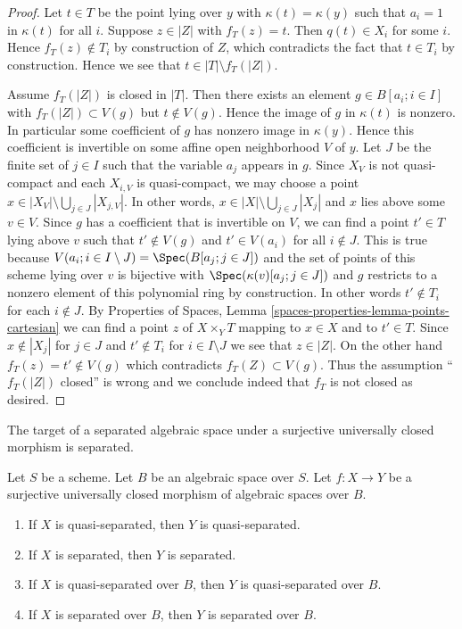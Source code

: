 \begin{proof}
\medskip\noindent
Let $t \in T$ be the point lying over $y$ with $\kappa(t) = \kappa(y)$
such that $a_i = 1$ in $\kappa(t)$ for all $i$. Suppose $z \in |Z|$ with
$f_T(z) = t$. Then $q(t) \in X_i$ for some $i$. Hence $f_T(z) \not \in T_i$
by construction of $Z$, which contradicts the fact that $t \in T_i$ by
construction. Hence we see that $t \in |T| \setminus f_T(|Z|)$.

\medskip\noindent
Assume $f_T(|Z|)$ is closed in $|T|$. Then there exists an element
$g \in B[a_i; i \in I]$ with $f_T(|Z|) \subset V(g)$ but $t \not \in V(g)$.
Hence the image of $g$ in $\kappa(t)$ is nonzero. In particular some
coefficient of $g$ has nonzero image in $\kappa(y)$. Hence this coefficient is
invertible on some affine open neighborhood $V$ of $y$. Let $J$ be the finite
set of $j \in I$ such that the variable $a_j$ appears in $g$.
Since $X_V$ is not quasi-compact and each $X_{i, V}$ is quasi-compact,
we may choose a point $x \in |X_V| \setminus \bigcup_{j \in J} |X_{j, V}|$.
In other words, $x \in |X| \setminus \bigcup_{j \in J} |X_j|$ and $x$ lies
above some $v \in V$. Since $g$ has a coefficient that is invertible on $V$,
we can find a point $t' \in T$ lying above $v$ such that $t' \not \in V(g)$ and
$t' \in V(a_i)$ for all $i \notin J$. This is true because
$V(a_i; i \in I \setminus J) = \Spec(B[a_j; j\in J])$
and the set of points of this scheme lying over $v$ is bijective
with $\Spec(\kappa(v)[a_j; j \in J])$ and $g$ restricts to
a nonzero element of this polynomial ring by construction.
In other words $t' \not \in T_i$ for each $i \not \in J$. By
Properties of Spaces, Lemma \ref{spaces-properties-lemma-points-cartesian}
we can find a point $z$ of $X \times_Y T$ mapping to $x \in X$ and to
$t' \in T$. Since $x \not \in |X_j|$ for $j \in J$ and $t' \not \in T_i$
for $i \in I \setminus J$ we see that $z \in |Z|$. On the other hand
$f_T(z) = t' \not \in V(g)$ which contradicts $f_T(Z) \subset V(g)$.
Thus the assumption ``$f_T(|Z|)$ closed'' is wrong and we conclude indeed
that $f_T$ is not closed as desired.
\end{proof}

\noindent
The target of a separated algebraic space under a surjective
universally closed morphism is separated.

\begin{lemma}
\label{lemma-image-universally-closed-separated}
Let $S$ be a scheme. Let $B$ be an algebraic space over $S$.
Let $f : X \to Y$ be a surjective universally closed
morphism of algebraic spaces over $B$.
\begin{enumerate}
\item If $X$ is quasi-separated, then $Y$ is quasi-separated.
\item If $X$ is separated, then $Y$ is separated.
\item If $X$ is quasi-separated over $B$, then $Y$ is quasi-separated over $B$.
\item If $X$ is separated over $B$, then $Y$ is separated over $B$.
\end{enumerate}
\end{lemma}

